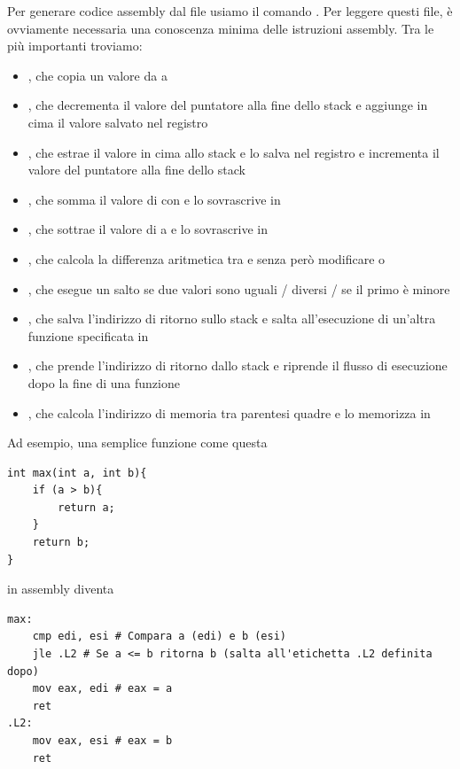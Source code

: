 \documentclass[11pt, a4paper, titlepage, oneside]{scrbook}
\begin{document}
Per generare codice assembly dal file  usiamo il comando . Per leggere questi file, è ovviamente necessaria una conoscenza minima delle istruzioni assembly. Tra le più importanti troviamo:
\begin{itemize}
    \item {}, che copia un valore da  a 
    \item {}, che decrementa il valore del puntatore alla fine dello stack  e aggiunge in cima il valore salvato nel registro 
    \item {}, che estrae il valore in cima allo stack e lo salva nel registro  e incrementa il valore del puntatore alla fine dello stack 
    \item {}, che somma il valore di  con  e lo sovrascrive in 
    \item {}, che sottrae il valore di  a  e lo sovrascrive in 
    \item {}, che calcola la differenza aritmetica tra  e  senza però modificare  o 
    \item {}, che esegue un salto se due valori sono uguali / diversi / se il primo è minore
    \item {}, che salva l'indirizzo di ritorno sullo stack e salta all'esecuzione di un'altra funzione specificata in 
    \item {}, che prende l'indirizzo di ritorno dallo stack e riprende il flusso di esecuzione dopo la fine di una funzione
    \item {}, che calcola l'indirizzo di memoria tra parentesi quadre e lo memorizza in 
\end{itemize}

Ad esempio, una semplice funzione come questa
\begin{lstlisting}[style=C]
int max(int a, int b){
    if (a > b){
        return a;
    }
    return b;
}
\end{lstlisting}

in assembly diventa
\begin{lstlisting}[style=C]
max:
    cmp edi, esi # Compara a (edi) e b (esi)
    jle .L2 # Se a <= b ritorna b (salta all'etichetta .L2 definita dopo)
    mov eax, edi # eax = a
    ret
.L2:
    mov eax, esi # eax = b
    ret
\end{lstlisting}
\end{document}
